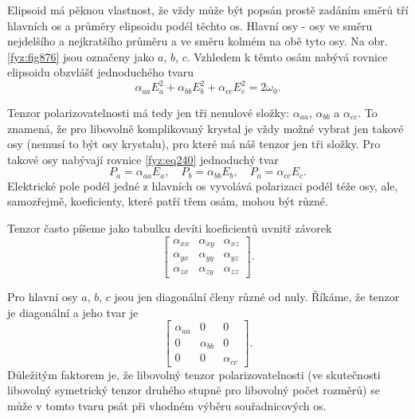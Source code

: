     Elipsoid má pěknou vlastnost, že vždy může být popsán prostě zadáním směrů tří hlavních os a
    průměry elipsoidu podél těchto os. Hlavní osy - osy ve směru nejdelšího a nejkratšího průměru a
    ve směru kolmém na obě tyto osy. Na obr. \ref{fyz:fig876} jsou označeny jako \(a\), \(b\),
    \(c\). Vzhledem k těmto osám nabývá rovnice elipsoidu obzvlášť jednoduchého tvaru
    \begin{equation*}
      \alpha_{aa}E_a^2 + \alpha_{bb}E_b^2 + \alpha_{cc}E_c^2= 2\omega_0.
    \end{equation*}

    Tenzor polarizovatelnosti má tedy jen tři nenulové složky: \(\alpha_{aa}\), \(\alpha_{bb}\) a
    \(\alpha_{cc}\). To znamená, že pro libovolně komplikovaný krystal je vždy možné vybrat jen
    takové osy (nemusí to být osy krystalu), pro které má náš tenzor jen tři složky. Pro takové osy
    nabývají rovnice \eqref{fyz:eq240} jednoduchý tvar
    \begin{equation}\label{fyz:eq832}
      P_a = \alpha_{aa}E_a,\quad P_b = \alpha_{bb}E_b,\quad P_a = \alpha_{cc}E_c.
    \end{equation}
    Elektrické pole podél jedné z hlavních os vyvolává polarizaci podél téže osy, ale, samozřejmě,
    koeficienty, které patří třem osám, mohou být různé.

    Tenzor často píšeme jako tabulku devíti koeficientů uvnitř závorek
    \begin{equation}\label{fyz:eq938} 
      \begin{bmatrix}
        \alpha_{xx}& \alpha_{xy}& \alpha_{xz} \\
        \alpha_{yx}& \alpha_{yy}& \alpha_{yz} \\
        \alpha_{zx}& \alpha_{zy}& \alpha_{zz}
      \end{bmatrix}.
    \end{equation}

    Pro hlavní osy \(a\), \(b\), \(c\) jsou jen diagonální členy různé od nuly. Říkáme, že tenzor je
    diagonální a jeho tvar je
    \begin{equation}\label{fyz:eq939}
      \begin{bmatrix}
        \alpha_{aa}&      0      &      0      \\
             0     & \alpha_{bb} &      0      \\
             0     &      0      & \alpha_{cc}
      \end{bmatrix}.
    \end{equation}
    Důležitým faktorem je, že libovolný tenzor polarizovatelnosti (ve skutečnosti libovolný
    symetrický tenzor druhého stupně pro libovolný počet rozměrů) se může v tomto tvaru psát při
    vhodném výběru souřadnicových os.
    
